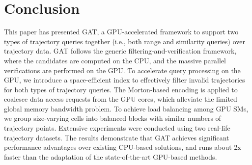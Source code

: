 \documentclass[10pt,conference,letterpaper]{IEEEtran}
\newcommand{\frname}{GAT\xspace }
\begin{document}



\section{Conclusion}\label{sec:conclusion}

This paper has presented \frname, a GPU-accelerated framework to support two types of trajectory queries together (i.e., both range and similarity queries) over trajectory data. \frname follows the generic filtering-and-verification framework, where the candidates are computed on the CPU, and the massive parallel verifications are performed on the GPU.
To accelerate query processing on the GPU, we introduce a space-efficient index to effectively filter invalid trajectories for both types of trajectory queries. The Morton-based encoding is applied to coalesce data access requests from the GPU cores, which alleviate the limited global memory bandwidth problem. To achieve load balancing among GPU SMs, we group size-varying cells into balanced blocks with similar numbers of trajectory points. Extensive experiments were conducted using two real-life trajectory datasets. The results demonstrate that GAT achieves significant performance advantages over existing CPU-based solutions, and runs about 2x faster than the adaptation of the state-of-the-art GPU-based methods.




\end{document}
